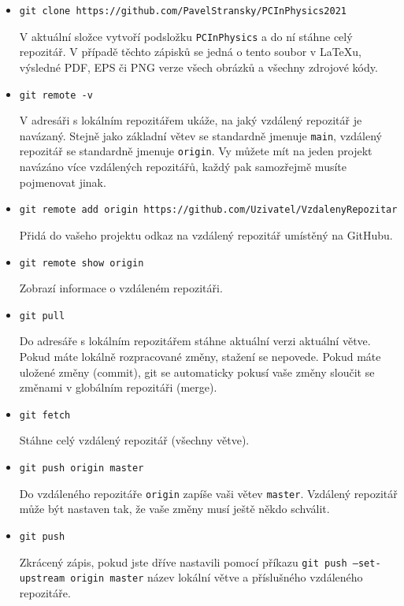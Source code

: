\documentclass[a4paper,11pt,twoside]{article}
\def\code#1{\textnormal{\texttt{#1}}}
\theoremstyle{red}
\theoremstyle{green}
\begin{document}
    \begin{itemize}
    \item \code{git clone https://github.com/PavelStransky/PCInPhysics2021}
    
        V aktuální složce vytvoří podsložku \code{PCInPhysics} a do ní stáhne celý repozitář.
        V případě těchto zápisků se jedná o tento soubor v {\LaTeX}u,
        výsledné PDF, EPS či PNG verze všech obrázků a všechny zdrojové kódy.

    \item \code{git remote -v}
    
        V adresáři s lokálním repozitářem ukáže, na jaký vzdálený repozitář je navázaný.
        Stejně jako základní větev se standardně jmenuje \code{main}, vzdálený repozitář se standardně jmenuje \code{origin}.
        Vy můžete mít na jeden projekt navázáno více vzdálených repozitářů, každý pak samozřejmě musíte pojmenovat jinak.

    \item \code{git remote add origin https://github.com/Uzivatel/VzdalenyRepozitar}
    
        Přidá do vašeho projektu odkaz na vzdálený repozitář umístěný na GitHubu.

    \item \code{git remote show origin}
    
        Zobrazí informace o vzdáleném repozitáři.

    \item \code{git pull}
    
        Do adresáře s lokálním repozitářem stáhne aktuální verzi aktuální větve.
        Pokud máte lokálně rozpracované změny, stažení se nepovede.
        Pokud máte uložené změny (commit), git se automaticky pokusí vaše změny sloučit se změnami v globálním repozitáři (merge).
        
    \item \code{git fetch}
    
        Stáhne celý vzdálený repozitář (všechny větve).
    
    \item \code{git push origin master}
    
        Do vzdáleného repozitáře \code{origin} zapíše vaši větev \code{master}.
        Vzdálený repozitář může být nastaven tak, že vaše změny musí ještě někdo schválit.

    \item \code{git push}

        Zkrácený zápis, pokud jste dříve nastavili pomocí příkazu \code{git push --set-upstream origin master} název lokální větve a příslušného vzdáleného repozitáře.

    \end{itemize}
\end{document}

